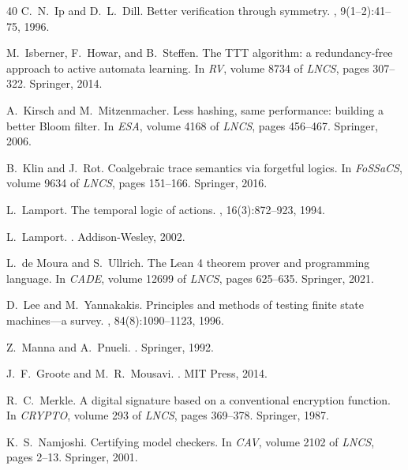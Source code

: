 \documentclass[11pt]{article}
\begin{document}
\begin{thebibliography}{40}
C.~N.~Ip and D.~L.~Dill.
\newblock Better verification through symmetry.
, 9(1--2):41--75, 1996.

M.~Isberner, F.~Howar, and B.~Steffen.
\newblock The {TTT} algorithm: a redundancy-free approach to active automata
  learning.
\newblock In {\em RV}, volume 8734 of {\em LNCS}, pages 307--322. Springer,
  2014.

A.~Kirsch and M.~Mitzenmacher.
\newblock Less hashing, same performance: building a better {Bloom} filter.
\newblock In {\em ESA}, volume 4168 of {\em LNCS}, pages 456--467. Springer,
  2006.

B.~Klin and J.~Rot.
\newblock Coalgebraic trace semantics via forgetful logics.
\newblock In {\em FoSSaCS}, volume 9634 of {\em LNCS}, pages 151--166.
  Springer, 2016.

L.~Lamport.
\newblock The temporal logic of actions.
, 16(3):872--923, 1994.

L.~Lamport.
.
\newblock Addison-Wesley, 2002.

L.~de Moura and S.~Ullrich.
\newblock The {Lean 4} theorem prover and programming language.
\newblock In {\em CADE}, volume 12699 of {\em LNCS}, pages 625--635. Springer,
  2021.

D.~Lee and M.~Yannakakis.
\newblock Principles and methods of testing finite state machines---a survey.
, 84(8):1090--1123, 1996.

Z.~Manna and A.~Pnueli.
.
\newblock Springer, 1992.

J.~F.~Groote and M.~R.~Mousavi.
.
\newblock MIT Press, 2014.

R.~C.~Merkle.
\newblock A digital signature based on a conventional encryption function.
\newblock In {\em CRYPTO}, volume 293 of {\em LNCS}, pages 369--378. Springer,
  1987.

K.~S.~Namjoshi.
\newblock Certifying model checkers.
\newblock In {\em CAV}, volume 2102 of {\em LNCS}, pages 2--13. Springer, 2001.


\end{thebibliography}
\end{document}
